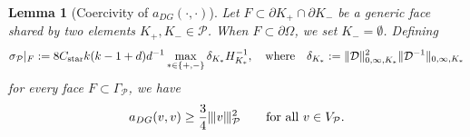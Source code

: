 \documentclass[11pt,final]{amsart}
\theoremstyle{plain}
\newtheorem{lemma}[theorem]{Lemma}
\theoremstyle{definition}
\newcommand\calP{{\mathcal{P}}}
\newcommand{\mesh}{\calP}
\newcommand{\ndgp}[1]{| \kern -.25mm \|{#1}| \kern -.25mm \|_{\rm \mesh}}
\newcommand{\norm}[2]{\|{#1}\|_{{#2}}}
\renewcommand{\k}{K}
\begin{document}
\begin{lemma}[Coercivity of { $a_{DG}(\cdot,\cdot)$}]
  \label{lem:coercivity_coarse}
  Let $F\subset \partial\k_+\cap\partial \k_- $ be a generic face
  shared by two elements $\k_+,\k_-\in\mesh$.  When
  $F\subset\partial\Omega$, we set $\k_-=\emptyset$.  Defining
  \begin{equation}\label{penalty}
    \sigma_\mesh|_F:=8C_{\rm star}k(k-1+d)d^{-1}\max_{*\in\{+,-\}}\delta_{\k_*}H_{\k_*}^{-1},\quad\textrm{where}\quad \delta_{\k_*}:=\norm{\mathcal{D}}{0,\infty,K_*}^2\norm{\mathcal{D}^{-1}}{0,\infty,K_*}
  \end{equation}
  for every  face $F\subset\Gamma_{\mesh}$, we have 
  \begin{equation}\label{coercivity}
    a_{DG}(v,v)\ge \frac{3}{4} \ndgp{v}^2 \qquad\text{for all } v\in V_\mesh.
  \end{equation}
\end{lemma}
\end{document}
